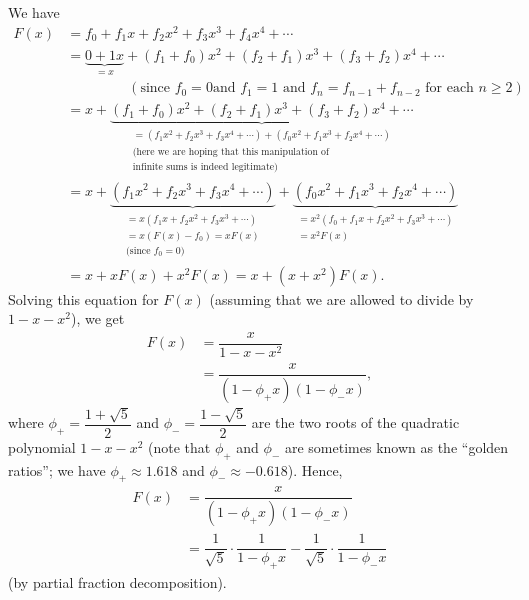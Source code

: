 We have%
\begin{align*}
F\left(  x\right)   &  =f_{0}+f_{1}x+f_{2}x^{2}+f_{3}x^{3}+f_{4}x^{4}+\cdots\\
&  =\underbrace{0+1x}_{=x}+\left(  f_{1}+f_{0}\right)  x^{2}+\left(
f_{2}+f_{1}\right)  x^{3}+\left(  f_{3}+f_{2}\right)  x^{4}+\cdots\\
&  \ \ \ \ \ \ \ \ \ \ \ \ \ \ \ \ \ \ \ \ \left(  \text{since }f_{0}=0\text{
and }f_{1}=1\text{ and }f_{n}=f_{n-1}+f_{n-2}\text{ for each }n\geq2\right) \\
&  =x+\underbrace{\left(  f_{1}+f_{0}\right)  x^{2}+\left(  f_{2}%
+f_{1}\right)  x^{3}+\left(  f_{3}+f_{2}\right)  x^{4}+\cdots}%
_{\substack{=\left(  f_{1}x^{2}+f_{2}x^{3}+f_{3}x^{4}+\cdots\right)  +\left(
f_{0}x^{2}+f_{1}x^{3}+f_{2}x^{4}+\cdots\right)  \\\text{(here we are hoping
that this manipulation of}\\\text{infinite sums is indeed legitimate)}}}\\
&  =x+\underbrace{\left(  f_{1}x^{2}+f_{2}x^{3}+f_{3}x^{4}+\cdots\right)
}_{\substack{=x\left(  f_{1}x+f_{2}x^{2}+f_{3}x^{3}+\cdots\right)  \\=x\left(
F\left(  x\right)  -f_{0}\right)  =xF\left(  x\right)  \\\text{(since }%
f_{0}=0\text{)}}}+\underbrace{\left(  f_{0}x^{2}+f_{1}x^{3}+f_{2}x^{4}%
+\cdots\right)  }_{\substack{=x^{2}\left(  f_{0}+f_{1}x+f_{2}x^{2}+f_{3}%
x^{3}+\cdots\right)  \\=x^{2}F\left(  x\right)  }}\\
&  =x+xF\left(  x\right)  +x^{2}F\left(  x\right)  =x+\left(  x+x^{2}\right)
F\left(  x\right)  .
\end{align*}
Solving this equation for $F\left(  x\right)  $ (assuming that we are allowed
to divide by $1-x-x^{2}$), we get%
\begin{align}
F\left(  x\right)   &  =\dfrac{x}{1-x-x^{2}}\label{eq.sec.gf.exas.1.Fx=1}\\
&  =\dfrac{x}{\left(  1-\phi_{+}x\right)  \left(  1-\phi_{-}x\right)
},\nonumber
\end{align}
where $\phi_{+}=\dfrac{1+\sqrt{5}}{2}$ and $\phi_{-}=\dfrac{1-\sqrt{5}}{2}$
are the two roots of the quadratic polynomial $1-x-x^{2}$ (note that $\phi
_{+}$ and $\phi_{-}$ are sometimes known as the \textquotedblleft golden
ratios\textquotedblright; we have $\phi_{+}\approx1.618$ and $\phi_{-}%
\approx-0.618$). Hence,%
\begin{align}
F\left(  x\right)   &  =\dfrac{x}{\left(  1-\phi_{+}x\right)  \left(
1-\phi_{-}x\right)  }\nonumber\\
&  =\dfrac{1}{\sqrt{5}}\cdot\dfrac{1}{1-\phi_{+}x}-\dfrac{1}{\sqrt{5}}%
\cdot\dfrac{1}{1-\phi_{-}x} \label{eq.sec.gf.exas.1.Fx=2}%
\end{align}
(by partial fraction decomposition).

